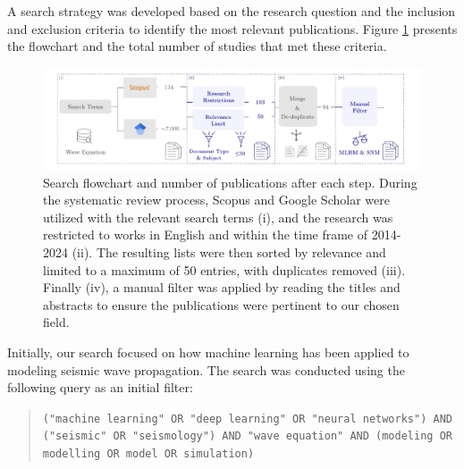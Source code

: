 \documentclass[11pt,twoside]{article}
\begin{document}
A search strategy was developed based on the research question and the inclusion and exclusion criteria to 
identify the most relevant publications. Figure \ref{fig:scheme_systematic_review} presents the flowchart and 
the total number of studies that met these criteria.

\begin{figure}[h]
    \includegraphics[width=1.0\textwidth]{figs/scheme_systematic_review.pdf}
\caption{Search flowchart and number of publications after each step. During the systematic review process, 
Scopus and Google Scholar were utilized with the relevant search terms (i), and the research was restricted to works 
in English and within the time frame of 2014-2024 (ii). The resulting lists were then sorted by relevance and limited 
to a maximum of 50 entries, with duplicates removed (iii). Finally (iv), a manual filter was applied by reading the 
titles and abstracts to ensure the publications were pertinent to our chosen field.}\label{fig:scheme_systematic_review}
\end{figure}

Initially, our search focused on how machine learning has been applied to modeling seismic wave propagation. 
The search was conducted using the following query as an initial filter:

\vspace*{2mm}

\begin{tcolorbox}[colback=gray!20, colframe=gray!20, sharp corners]
\begin{quote}
\noindent\texttt{("machine learning" OR "deep learning" OR "neural networks") AND ("seismic" OR 
"seismology") AND "wave equation" AND (modeling OR modelling OR model OR simulation)}
\end{quote}
\end{tcolorbox}

\vspace*{2mm}
\end{document}
